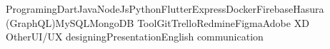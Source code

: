 
\begin{cvskills}

   \cvskill
    {Programing}{Dart{\enskip\cdotp\enskip}Java{\enskip\cdotp\enskip}NodeJs{\enskip\cdotp\enskip}Python{\enskip\cdotp\enskip}Flutter{\enskip\cdotp\enskip}Express{\enskip\cdotp\enskip}Docker{\enskip\cdotp\enskip}Firebase{\enskip\cdotp\enskip}Hasura (GraphQL){\enskip\cdotp\enskip}MySQL{\enskip\cdotp\enskip}MongoDB}
    \cvskill
    {Tool}{Git{\enskip\cdotp\enskip}Trello{\enskip\cdotp\enskip}Redmine{\enskip\cdotp\enskip}Figma{\enskip\cdotp\enskip}Adobe XD}
    \cvskill
    {Other}{UI/UX designing{\enskip\cdotp\enskip}Presentation{\enskip\cdotp\enskip}English communication}
\end{cvskills}